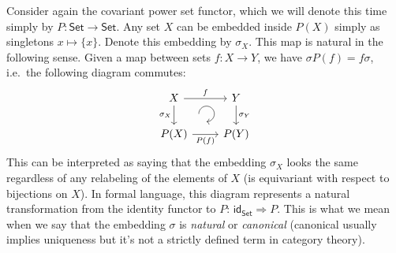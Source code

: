 \begin{example}
    Consider again the covariant power set functor, which we will denote this time simply by $P:\mathsf{Set}\to \mathsf{Set}$. Any set $X$ can be embedded inside $P(X)$ simply as singletons $x\mapsto \{x\}$. Denote this embedding by $\sigma_X$. This map is natural in the following sense. Given a map between sets $f:X\to Y$, we have $\sigma P(f)=f \sigma$, i.e.\ the following diagram commutes:
    \[\begin{tikzcd}[every matrix/.append style={name=m},execute at end picture={\draw [<-] ([xshift=-2.7em,yshift=1mm]m-2-2.north) arc[start angle=-90,delta angle=270,radius=0.25cm];}]
   X \arrow[r,"f"]\arrow[d,swap,"\sigma_X"]& Y\arrow[d,"\sigma_Y"] \\
   P(X)\arrow[r,swap,"P(f)"]& P(Y)
\end{tikzcd}\]
This can be interpreted as saying that the embedding $\sigma_X$ looks the same regardless of any relabeling of the elements of $X$ (is equivariant with respect to bijections on $X$). In formal language, this diagram represents a natural transformation from the identity functor to $P$: $\mathsf{id}_{\mathsf{Set}}\Longrightarrow P$. This is what we mean when we say that the embedding $\sigma$ is \emph{natural} or \emph{canonical} (canonical usually implies uniqueness but it's not a strictly defined term in category theory).
\end{example}
%
